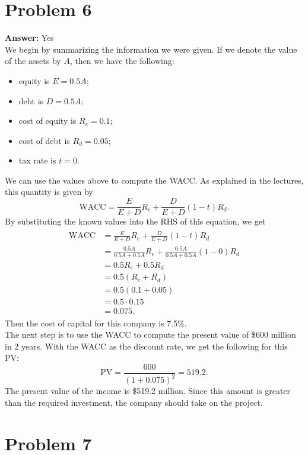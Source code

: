 \documentclass[11pt]{article}
\begin{document}
\section*{Problem 6}
\label{sec:org43c237b}

\textbf{Answer:} Yes\\

We begin by summarizing the information we were given. If we denote the value of
the assets by \(A\), then we have the following:
\begin{itemize}
\item equity is \(E=0.5 A\);
\item debt is \(D=0.5 A\);
\item cost of equity is \(R_e=0.1\);
\item cost of debt is \(R_d=0.05\);
\item tax rate is \(t=0\).
\end{itemize}
We can use the values above to compute the WACC. As explained in the lectures,
this quantity is given by
\begin{equation}
\mathrm{WACC}=\frac{E}{E+D}R_e+\frac{D}{E+D}(1-t)R_d.
\end{equation}
By substituting the known values into the RHS of this equation, we get
\begin{align}
  \begin{split}
    \mathrm{WACC}&=\frac{E}{E+D}R_e+\frac{D}{E+D}(1-t)R_d\\
    &=\frac{0.5 A}{0.5 A+0.5 A}R_e+\frac{0.5 A}{0.5 A+0.5 A}(1-0)R_d\\
    &=0.5 R_e+0.5 R_d\\
    &=0.5(R_e+R_d)\\
    &=0.5(0.1+0.05)\\
    &=0.5\cdot 0.15\\
    &=0.075.
  \end{split}
\end{align}
Then the cost of capital for this company is 7.5\%.\\
The next step is to use the WACC to compute the present value of \$600 million in
2 years. With the WACC as the discount rate, we get the following for this PV:
\begin{equation}
\mathrm{PV}=\frac{600}{(1+0.075)^2}=519.2.
\end{equation}
The present value of the income is \$519.2 million. Since this amount is greater
than the required investment, the company should take on the project.
\section*{Problem 7}
\label{sec:org349b788}
\end{document}
